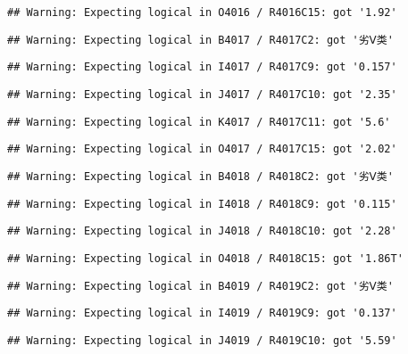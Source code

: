 \documentclass[
]{article}
\begin{document}
\begin{verbatim}
## Warning: Expecting logical in O4016 / R4016C15: got '1.92'
\end{verbatim}

\begin{verbatim}
## Warning: Expecting logical in B4017 / R4017C2: got '劣Ⅴ类'
\end{verbatim}

\begin{verbatim}
## Warning: Expecting logical in I4017 / R4017C9: got '0.157'
\end{verbatim}

\begin{verbatim}
## Warning: Expecting logical in J4017 / R4017C10: got '2.35'
\end{verbatim}

\begin{verbatim}
## Warning: Expecting logical in K4017 / R4017C11: got '5.6'
\end{verbatim}

\begin{verbatim}
## Warning: Expecting logical in O4017 / R4017C15: got '2.02'
\end{verbatim}

\begin{verbatim}
## Warning: Expecting logical in B4018 / R4018C2: got '劣Ⅴ类'
\end{verbatim}

\begin{verbatim}
## Warning: Expecting logical in I4018 / R4018C9: got '0.115'
\end{verbatim}

\begin{verbatim}
## Warning: Expecting logical in J4018 / R4018C10: got '2.28'
\end{verbatim}

\begin{verbatim}
## Warning: Expecting logical in O4018 / R4018C15: got '1.86T'
\end{verbatim}

\begin{verbatim}
## Warning: Expecting logical in B4019 / R4019C2: got '劣Ⅴ类'
\end{verbatim}

\begin{verbatim}
## Warning: Expecting logical in I4019 / R4019C9: got '0.137'
\end{verbatim}

\begin{verbatim}
## Warning: Expecting logical in J4019 / R4019C10: got '5.59'
\end{verbatim}
\end{document}
